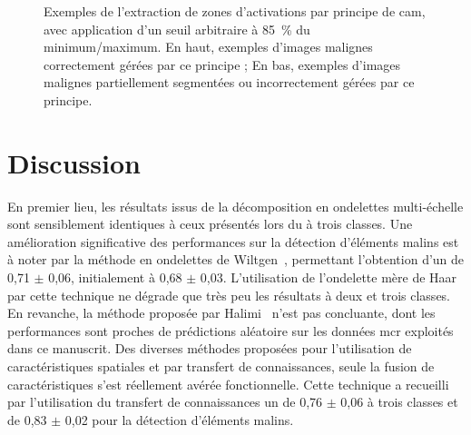 \begin{figure}[p]
    \caption{Exemples de l'extraction de zones d'activations par principe de \gls{cam}, avec application d'un seuil arbitraire à 85~\% du minimum/maximum. En haut, exemples d'images malignes correctement gérées par ce principe ; En bas, exemples d'images malignes partiellement segmentées ou incorrectement gérées par ce principe.}
    \label{fig:example_image_improvement_ft}
\end{figure}\par
\clearpage

\section{Discussion}
En premier lieu, les résultats issus de la décomposition en ondelettes multi-échelle sont sensiblement identiques à ceux présentés lors du  à trois classes. Une amélioration significative des performances sur la détection d'éléments malins est à noter par la méthode en ondelettes de Wiltgen~, permettant l'obtention d'un \fscore{} de 0,71 $\pm$ 0,06, initialement à 0,68 $\pm$ 0,03. L'utilisation de l'ondelette mère de Haar par cette technique ne dégrade que très peu les résultats à deux et trois classes. En revanche, la méthode proposée par Halimi~ n'est pas concluante, dont les performances sont proches de prédictions aléatoire sur les données \gls{mcr} exploités dans ce manuscrit. Des diverses méthodes proposées pour l'utilisation de caractéristiques spatiales et par transfert de connaissances, seule la fusion de caractéristiques s'est réellement avérée fonctionnelle. Cette technique a recueilli par l'utilisation du transfert de connaissances un \fscore{} de 0,76 $\pm$ 0,06 à trois classes et de 0,83 $\pm$ 0,02 pour la détection d'éléments malins.\par

